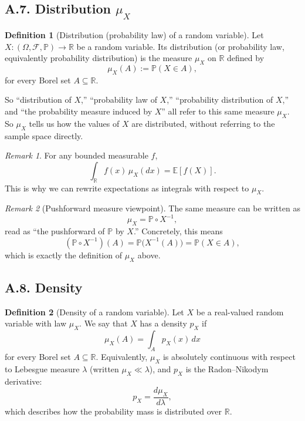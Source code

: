 \documentclass[11pt]{article}
\theoremstyle{definition}
\newtheorem{definition}{Definition}
\theoremstyle{remark}
\newtheorem{remark}{Remark}
\begin{document}
\subsection*{A.7. Distribution $\mu_X$}
\begin{definition}[Distribution (probability law) of a random variable]
Let $X:(\Omega,\mathcal F,\mathbb P)\to\mathbb R$ be a random variable. Its distribution (or probability law, equivalently probability distribution) is the measure $\mu_X$ on $\mathbb R$ defined by
\[
\mu_X(A):=\mathbb P(X\in A),
\]
for every Borel set $A\subseteq\mathbb R$.

So ``distribution of $X$,'' ``probability law of $X$,'' ``probability distribution of $X$,'' and ``the probability measure induced by $X$'' all refer to this same measure $\mu_X$.
So $\mu_X$ tells us how the values of $X$ are distributed, without referring to the sample space directly.
\end{definition}

\begin{remark}
For any bounded measurable $f$,
\[
\int_{\mathbb R} f(x)\,\mu_X(dx)=\mathbb E[f(X)].
\]
This is why we can rewrite expectations as integrals with respect to $\mu_X$.
\end{remark}

\begin{remark}[Pushforward measure viewpoint]
The same measure can be written as
\[
\mu_X = \mathbb P\circ X^{-1},
\]
read as ``the pushforward of $\mathbb P$ by $X$.'' Concretely, this means
\[
(\mathbb P\circ X^{-1})(A)=\mathbb P\!\bigl(X^{-1}(A)\bigr)=\mathbb P(X\in A),
\]
which is exactly the definition of $\mu_X$ above.
\end{remark}

\subsection*{A.8. Density}
\begin{definition}[Density of a random variable]
Let $X$ be a real-valued random variable with law $\mu_X$. We say that $X$ has a density $p_X$ if
\[
\mu_X(A)=\int_A p_X(x)\,dx
\]
for every Borel set $A\subseteq\mathbb R$.
Equivalently, $\mu_X$ is absolutely continuous with respect to Lebesgue measure $\lambda$ (written $\mu_X\ll\lambda$), and $p_X$ is the Radon--Nikodym derivative:
\[
p_X=\frac{d\mu_X}{d\lambda},
\]
which describes how the probability mass is distributed over $\mathbb R$.
\end{definition}
\end{document}
